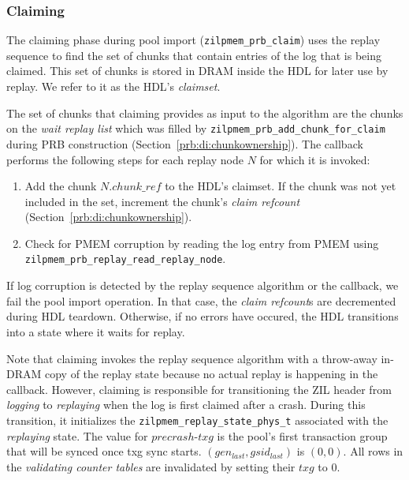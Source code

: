\documentclass[12pt,a4paper,twoside]{book}
\begin{document}
\subsubsection{Claiming}
The claiming phase during pool import (\lstinline{zilpmem_prb_claim}) uses the replay sequence to find the set of chunks that contain entries of the log that is being claimed.
This set of chunks is stored in DRAM inside the HDL for later use by replay.
We refer to it as the HDL's \textit{claimset}.

The set of chunks that claiming provides as input to the algorithm are the chunks on the \textit{wait replay list} which was filled by \lstinline{zilpmem_prb_add_chunk_for_claim} during PRB construction (Section~\ref{prb:di:chunkownership}).
The callback performs the following steps for each replay node $N$ for which it is invoked:
\begin{enumerate}
    \item Add the chunk $N.chunk\_ref$ to the HDL's claimset.
        If the chunk was not yet included in the set, increment the chunk's \textit{claim refcount} (Section~\ref{prb:di:chunkownership}).
    \item Check for PMEM corruption by reading the log entry from PMEM using \lstinline{zilpmem_prb_replay_read_replay_node}.
\end{enumerate}
If log corruption is detected by the replay sequence algorithm or the callback, we fail the pool import operation.
In that case, the \textit{claim refcount}s are decremented during HDL teardown.
Otherwise, if no errors have occured, the HDL transitions into a state where it waits for replay.

Note that claiming invokes the replay sequence algorithm with a throw-away in-DRAM copy of the replay state because no actual replay is happening in the callback.
However, claiming is responsible for transitioning the ZIL header from \textit{logging} to \textit{replaying} when the log is first claimed after a crash.
During this transition, it initializes the \lstinline{zilpmem_replay_state_phys_t} associated with the \textit{replaying} state.
The value for $precrash\text{-}txg$ is the pool's first transaction group that will be synced once txg sync starts.
$(gen_{last}, gsid_{last})$ is $(0, 0)$.
All rows in the \textit{validating counter tables} are invalidated by setting their $txg$ to $0$.
\end{document}
